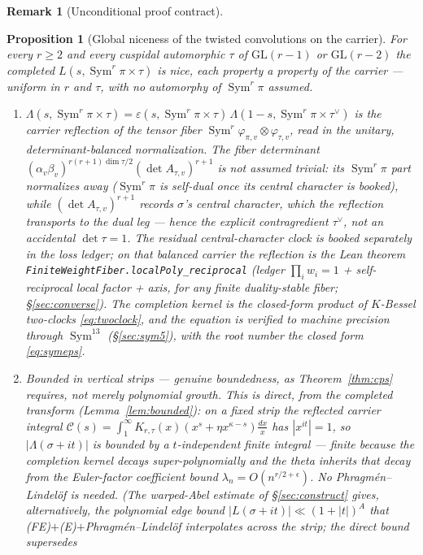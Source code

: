 \documentclass[11pt]{article}
\newtheorem{proposition}[theorem]{Proposition}
\theoremstyle{definition}
\newtheorem{remark}[theorem]{Remark}
\newcommand{\Sym}{\operatorname{Sym}}
\begin{document}
\begin{remark}[Unconditional proof contract]
\begin{enumerate}
\begin{proposition}[Global niceness of the twisted convolutions on the carrier]\label{prop:niceness}
For every $r\ge2$ and every cuspidal automorphic $\tau$ of $\mathrm{GL}(r-1)$ or $\mathrm{GL}(r-2)$
the completed $L(s,\Sym^r\pi\times\tau)$ is nice, each property a property of the carrier --- uniform
in $r$ and $\tau$, with no automorphy of $\Sym^r\pi$ assumed.
\begin{enumerate}
\item[\textup{(FE)}]
$\Lambda(s,\Sym^r\pi\times\tau)=\varepsilon(s,\Sym^r\pi\times\tau)\,\Lambda(1-s,\Sym^r\pi\times\tau^{\vee})$
is the carrier reflection of the tensor fiber $\Sym^r\varphi_{\pi,v}\otimes\varphi_{\tau,v}$, read in the
\emph{unitary, determinant-balanced} normalization. The fiber determinant
$(\alpha_v\beta_v)^{r(r+1)\dim\tau/2}(\det A_{\tau,v})^{r+1}$ is \emph{not} assumed trivial: its
$\Sym^r\pi$ part normalizes away ($\Sym^r\pi$ is self-dual once its central character is booked), while
$(\det A_{\tau,v})^{r+1}$ records $\sigma$'s central character, which the reflection transports to the dual
leg --- hence the explicit contragredient $\tau^{\vee}$, not an accidental $\det\tau=1$. The residual
central-character clock is booked separately in the loss ledger; on that balanced carrier the reflection is
the Lean theorem \texttt{FiniteWeightFiber.localPoly\_reciprocal} (ledger $\prod_i w_i=1$ + self-reciprocal
local factor + axis, for any finite duality-stable fiber; \S\ref{sec:converse}). The completion kernel is the
closed-form product of $K$-Bessel two-clocks \eqref{eq:twoclock}, and the equation is verified to machine
precision through $\Sym^{13}$ (\S\ref{sec:sym5}), with the root number the closed form \eqref{eq:symeps}.
\item[\textup{(B)}] \emph{Bounded in vertical strips} --- genuine boundedness, as Theorem~\ref{thm:cps}
requires, not merely polynomial growth. This is direct, from the completed transform (Lemma~\ref{lem:bounded}):
on a fixed strip the reflected carrier integral $\mathcal C(s)=\int_1^\infty K_{r,\tau}(x)(x^{s}+\eta x^{\kappa-s})
\tfrac{dx}{x}$ has $|x^{it}|=1$, so $|\Lambda(\sigma+it)|$ is bounded by a $t$-independent finite integral --- finite
because the completion kernel decays super-polynomially and the theta inherits that decay from the Euler-factor
coefficient bound $\lambda_n=O(n^{r/2+\epsilon})$. No Phragm\'en--Lindel\"of is needed. (The warped-Abel estimate
of \S\ref{sec:construct} gives, alternatively, the polynomial edge bound $|L(\sigma+it)|\ll(1+|t|)^A$ that
\textup{(FE)}$+$\textup{(E)}$+$Phragm\'en--Lindel\"of interpolates across the strip; the direct bound supersedes

\end{enumerate}
\end{proposition}
\end{enumerate}
\end{remark}
\end{document}
